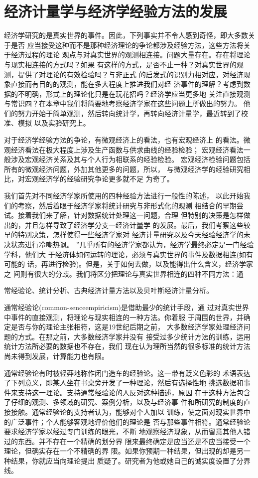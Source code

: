 \chapter{经济计量学与经济学经验方法的发展}

经济学研究的是真实世界的事件。因此，下列事实并不令人感到奇怪，即大多数关于是否
应当接受这种而不是那种经济理论的争论都涉及经验方法，这些方法将关于经济过程的理论
观点与对真实世界的观测相连接。问题大量存在。存在将理论与现实相连接的方式吗？如果
有这样的方式，是否不止一种？对真实世界的观测，提供了对理论的有效检验吗？与非正式
的启发式的识别力相对应，对经济现象直接而有目的的观测，能在多大程度上推进我们对经
济事件的理解？考虑到数据的不明确，形式上的理论化只是在玩花招吗？经济学应当更多地
关注直接观测与常识四？在本章中我们将简要地考察经济学家在这些问题上所做出的努力。
他们的努力开始于简单观测，然后转向统计学，再转向经济计量学，最近转到了校准、模拟
以及实验研究上。

对于经济学经验方法的争论，有微观经济上的看法，也有宏观经济上
的看法。微观经济看法在极大程度上涉及生产函数与供求曲线的经验检验；
宏观经济看法一般涉及宏观经济关系及其与个人行为相联系的经验检验。
宏观经济检验问题包括所有的微观经济问题，外加其他更多的问题，所以，
与微观经济学的经验研究相比，对宏观经济学的经验研究争论更多就不足
为奇了。

我们首先对不同经济学家所使用的四种经验方法进行一般性的陈述，
以此开始我们的考察，然后着眼于经济学家将统计研究与非形式化的观测
相结合的早期尝试。接着我们来了解，针对数据统计处理这一问题，合理
但特别的决策是怎样做出的，并且怎样导致了经济学分支一经济计量学
的发展。最后，我们考察这些较早的特别决策，怎样使得一些经济学家对
经济计量研究以及今天经验经济学的未决状态进行冷嘲热讽。
”几乎所有的经济学家都认为，经济学最终必定是一门经验学科，他们大
于经济体如何运转的理论，必须与真实世界的事件及数据相连(如有可能的
话，再进行检验)。但是，关于如何去做，以及能得出什么含义，经济学家之
间则有很大的分歧。我们将区分把理论与真实世界相连的四种不同方法：通


常经验论、统计分析、古典经济计量方法以及贝叶斯经济计量分析。

通常经验论(common-senceempiricism)是借助最少的统计手段，通
过对真实世界中事件的直接观测，将理论与现实相连的一种方法。你着服
于周围的世界，并确定是否与你的理论主张相符，这是19世纪后期之前，
大多数经济学家处理经济问题的方式。在那之前，大多数经济学家并没有
接受过多少统计方法的训练，运用统计方法所必要的数据也不存在，我们
现在认为理所当然的很多标准的统计方法尚未得到发展，计算能力也有限。

通常经验论有时被轻莽地称作闭门造车的经验论。这一带有贬义色彩的
术语表达了下列意义，即某人坐在书桌旁开发了一种理论，然后有选择性地
挑选数据和事件来支持这一理论。支持通常经验论的人反对这种描述，原因
在于这种方法包含了仔细的观测、多领域的研究、案例分析，以及与经济事
件和所研究的制度的直接接触。通常经验论的支持者认为，能够对个人加以
训练，使之面对现实世界中的广泛事件；个人能够客观地评价他们的理论是
否与那些事件相符。通常经验论要求经济学家以经过专门训练的眼光，不断
地观察经济现象，从而留意其他人错过的东西。并不存在一个精确的划分界
限来最终确定是应当还是不应当接受一个理论，但确实存在一个不精确的界
限。如果你预期一种结果，但出现的却是另一种结果，你就应当向理论提出
质疑了。研究者为他或她自己的诚实度设置了分界线。


